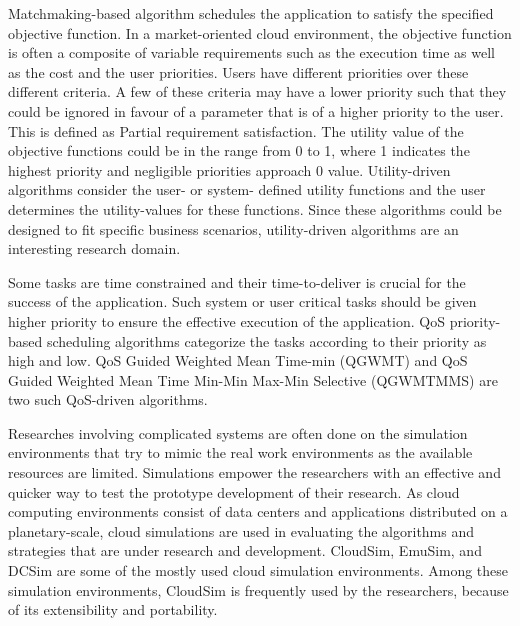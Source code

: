 \documentclass[times, 10pt,twocolumn]{article}
\begin{document}
Matchmaking-based algorithm schedules the application to satisfy the specified objective function. In a market-oriented cloud environment, the objective function is often a composite of variable requirements such as the execution time as well as the cost and the user priorities. Users have different priorities over these different criteria. A few of these criteria may have a lower priority such that they could be ignored in favour of a parameter that is of a higher priority to the user. This is defined as Partial requirement satisfaction. The utility value of the objective functions could be in the range from 0 to 1, where 1 indicates the highest priority and negligible priorities approach 0 value. Utility-driven algorithms consider the user- or system- defined utility functions and the user determines the utility-values for these functions. Since these algorithms could be designed to fit specific business scenarios, utility-driven algorithms are an interesting research domain.

Some tasks are time constrained and their time-to-deliver is crucial for the success of the application. Such system or user critical tasks should be given higher priority to ensure the effective execution of the application. QoS priority-based scheduling algorithms categorize the tasks according to their priority as high and low. QoS Guided Weighted Mean Time-min (QGWMT) and QoS Guided Weighted Mean Time Min-Min Max-Min Selective (QGWMTMMS) are two such QoS-driven algorithms\cite{qosgrid}. 

Researches involving complicated systems are often done on the simulation environments that try to mimic the real work environments as the available resources are limited. Simulations empower the researchers with an effective and quicker way to test the prototype development of their research. As cloud computing environments consist of data centers and applications distributed on a planetary-scale, cloud simulations are used in evaluating the algorithms and strategies that are under research and development. CloudSim, EmuSim\cite{emusim}, and DCSim\cite{dcsim} are some of the mostly used cloud simulation environments. Among these simulation environments, CloudSim is frequently used by the researchers, because of its extensibility and portability. 
\end{document}
